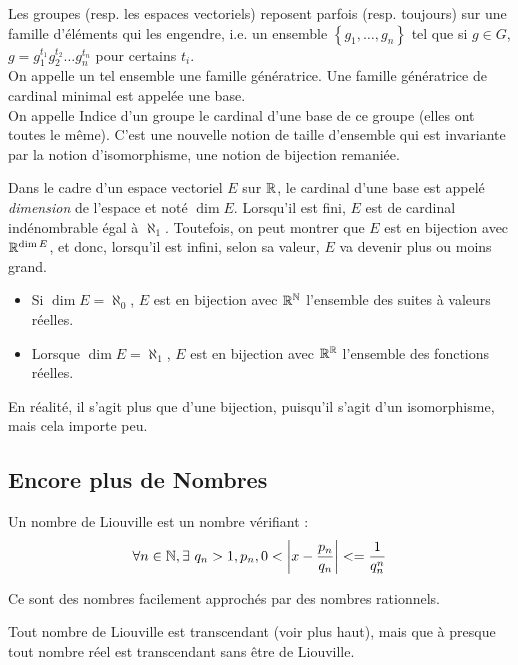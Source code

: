 \documentclass{cours}
\begin{document}
    \begin{definition}
        Les groupes (resp. les espaces vectoriels) reposent parfois (resp. toujours) sur une famille d'éléments qui les engendre, i.e. un ensemble $\left\{g_{1},\ldots, g_{n}\right\}$ tel que si $g \in G$, $g = g_{1}^{t_{1}}g_{2}^{t_{2}}\ldots g_{n}^{t_{n}}$ pour certains $t_{i}$.\\
        On appelle un tel ensemble une famille génératrice. Une famille génératrice de cardinal minimal est appelée une base. \\
        On appelle Indice d'un groupe le cardinal d'une base de ce groupe (elles ont toutes le même). C'est une nouvelle notion de taille d'ensemble qui est invariante par la notion d'isomorphisme, une notion de bijection remaniée.
    \end{definition}
    
    Dans le cadre d'un espace vectoriel $E$ sur $\mathbb{R}$, le cardinal d'une base est appelé \emph{dimension} de l'espace et noté $\dim E$. Lorsqu'il est fini, $E$ est de cardinal indénombrable égal à $\aleph_{1}$. Toutefois, on peut montrer que $E$ est en bijection avec $\mathbb{R}^{\dim E}$, et donc, lorsqu'il est infini, selon sa valeur, $E$ va devenir plus ou moins grand.\\
    \begin{proposition}
        \begin{itemize}
            \item Si $\dim E = \aleph_{0}$, $E$ est en bijection avec $\mathbb{R}^{\mathbb{N}}$ l'ensemble des suites à valeurs réelles.
            \item Lorsque $\dim E = \aleph_{1}$, $E$ est en bijection avec $\mathbb{R}^{\mathbb{R}}$ l'ensemble des fonctions réelles.
        \end{itemize}
    \end{proposition}

    \begin{remark}
        En réalité, il s'agit plus que d'une bijection, puisqu'il s'agit d'un isomorphisme, mais cela importe peu. 
    \end{remark}

    \subsection{Encore plus de Nombres}
    \begin{definition}
        Un nombre de Liouville est un nombre vérifiant : 
    \[
        \forall n \in \mathbb{N}, \exists\ q_{n} > 1, p_{n}, 0 < \left|x - \frac{p_{n}}{q_{n}}\right| <= \frac{1}{q_{n}^{n}}
    \]
    \end{definition}

    \begin{remark}
        Ce sont des nombres facilement approchés par des nombres rationnels.
    \end{remark}

    \begin{theorem}
        Tout nombre de Liouville est transcendant (voir plus haut), mais que à presque tout nombre réel est transcendant sans être de Liouville.
    \end{theorem}
    
\end{document}

